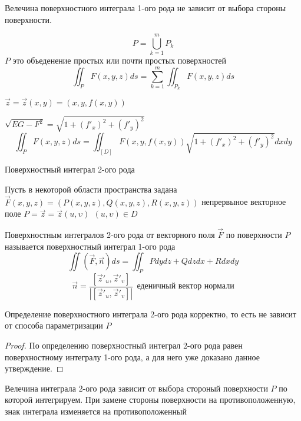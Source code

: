 \begin{theorem}
  Велечина поверхностного интеграла 1-ого рода не зависит от выбора стороны
  поверхности.
\end{theorem}

\begin{theorem}
  $$
  P = \bigcup_{k=1}^m P_k
  $$
  $P$ это объеденение простых или почти простых поверхностей
  $$
  \iint_P F(x,y,z) ds = \sum_{k=1}^m \iint_{P_k} F(x,y,z) ds
  $$
\end{theorem}

\begin{theorem}
  $\vec z = \vec z(x, y) = (x, y, f(x,y))$

  $\sqrt{EG-F^2} = \sqrt{1 + (f'_x)^2 + (f'_y)^2}$
  $$
  \iint_P F(x,y,z)ds = \iint_{[D]} F(x,y,f(x,y)) \sqrt{1 + (f'_x)^2 + (f'_y)^2}
  dx dy
  $$
\end{theorem}

\begin{title}[\Large]
  Поверхностный интеграл 2-ого рода
\end{title}

\begin{define}
  Пусть в некоторой области пространства задана
  $\vec F(x,y,z) = (P(x,y,z), Q(x,y,z),R(x,y,z))$ непрервыное векторное поле
  $P = \vec z = \vec z(u, \upsilon) ~~ (u, \upsilon) \in D$

  Поверхностным интегралов 2-ого рода от векторного поля $\vec F$ по поверхности
  $P$ называется поверхностный интеграл 1-ого рода
  $$
  \iint (\vec F, \vec n) ds = \iint_P P dy dz + Q dz dx + Rdx dy
  $$
  $$
  \vec n = \frac{[\vec z'_u, \vec z'_{\upsilon}]}
  {|[\vec z'_u, \vec z'_{\upsilon}]|} ~~
  \text{еденичный вектор нормали}
  $$
\end{define}

\begin{theorem}
  Определение поверхностного интеграла 2-ого рода корректно, то есть не зависит
  от способа параметризации $P$
\end{theorem}

\begin{proof}
  По определению поверхностный интеграл 2-ого рода равен поверхностному
  интегралу 1-ого рода, а для него уже доказано данное утверждение.
\end{proof}

\begin{theorem}
  Велечина интеграла 2-ого рода зависит от выбора стороный поверхности $P$ по
  которой интегрируем. При замене стороны поверхности на противоположенную,
  знак интеграла изменяется на противоположенный
\end{theorem}

